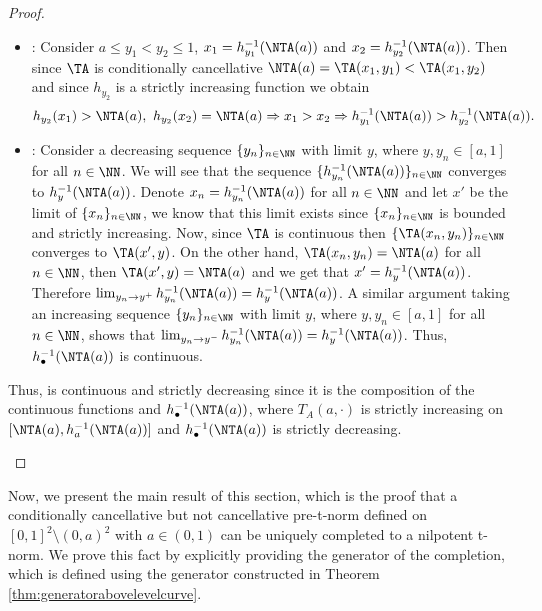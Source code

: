 \begin{proof}
\begin{enumerate}[label=(\roman*)]
\begin{itemize}
			\item \underline{}: Consider $a\leq y_1<y_2 \leq 1$, $x_1=h_{y_1}^{-1}(\NTA(a))$ and $x_2 =h_{y_2}^{-1}(\NTA(a))$. Then since $\TA$ is conditionally cancellative  $\NTA(a)=\TA(x_1,y_1) < \TA(x_1,y_2)$ and since $h_{y_2}$ is a strictly increasing function we obtain
			$$
			h_{y_2}(x_1)>\NTA(a),~ h_{y_2}(x_2)=\NTA(a) \Rightarrow x_1>x_2 \Rightarrow h_{y_1}^{-1}(\NTA(a)) > h_{y_2}^{-1}(\NTA(a)).
			$$
			\item \underline{}: Consider a decreasing sequence $\{y_n\}_{n \in \NN}$ with limit $y$, where $y,y_n \in [a,1]$ for all $n\in \NN$. We will see that the sequence $\{h_{y_n}^{-1}(\NTA(a))\}_{n \in \NN}$ converges to $h_{y}^{-1}(\NTA(a))$. Denote $x_n = h_{y_n}^{-1}(\NTA(a))$ for all $n \in \NN$ and let $x'$ be the limit of $\{x_n\}_{n \in \NN}$, we know that this limit exists since $\{x_n\}_{n \in \NN}$ is bounded and strictly increasing. Now, since $\TA$ is continuous then $\{\TA(x_n,y_n)\}_{n \in \NN}$ converges to $\TA(x',y)$. On the other hand, $\TA(x_n,y_n)=\NTA(a)$ for all $n \in \NN$, then $\TA(x',y)=\NTA(a)$ and we get that $x' = h_{y}^{-1}(\NTA(a))$. Therefore $\lim_{y_n \to y^+} h_{y_n}^{-1}(\NTA(a))=h_y^{-1}(\NTA(a))$. A similar argument taking an increasing sequence $\{y_n\}_{n \in \NN}$ with limit $y$, where $y,y_n \in [a,1]$ for all $n\in \NN$, shows that $\lim_{y_n \to y^-} h_{y_n}^{-1}(\NTA(a))=h_y^{-1}(\NTA(a))$. Thus, $h_{\bullet}^{-1}(\NTA(a))$ is continuous.
		\end{itemize}
		Thus, \NTA is continuous and strictly decreasing since it is the composition of the continuous functions \TA and $h_{\bullet}^{-1}(\NTA(a))$, where $T_A(a,\cdot)$ is strictly increasing on $[\NTA(a),h_a^{-1}(\NTA(a))]$ and $h_{\bullet}^{-1}(\NTA(a))$ is strictly decreasing. 
	\end{enumerate}
\end{proof}

Now, we present the main result of this section, which is the proof that a conditionally cancellative but not cancellative pre-t-norm defined on $[0,1]^2 \setminus (0,a)^2$ with $a \in (0,1)$ can be uniquely completed to a nilpotent t-norm. We prove this fact by explicitly providing the generator of the completion, which is defined using the generator constructed in Theorem \ref{thm:generatorabovelevelcurve}.

